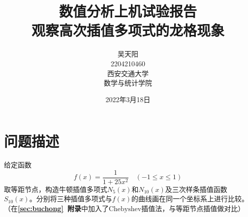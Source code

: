 \documentclass[12pt, a4paper, oneside]{ctexart}
\newcommand{\xiaosihao}{\fontsize{12pt}{\baselineskip}\selectfont}
\begin{document}
\newtheorem{example}{例}             %
\newtheorem{algorithm}{算法}
\newtheorem{theorem}{定理}[section]  %
\newtheorem{definition}{定义}
\newtheorem{axiom}{公理}
\newtheorem{property}{性质}
\newtheorem{proposition}{命题}
\newtheorem{lemma}{引理}
\newtheorem{corollary}{推论}
\newtheorem{remark}{注解}
\newtheorem{condition}{条件}
\newtheorem{conclusion}{结论}
\newtheorem{assumption}{假设}

\renewcommand{\contentsname}{目录}  %
\renewcommand{\abstractname}{摘要}  %
\renewcommand{\refname}{参考文献}   %
\renewcommand{\indexname}{索引}
\renewcommand{\figurename}{图}
\renewcommand{\tablename}{表}
\renewcommand{\appendixname}{附录}
\renewcommand{\algorithm}{算法}


\title{数值分析上机试验报告\\观察高次插值多项式的龙格现象}
\author{吴天阳\\2204210460\\[2ex]
\xiaosihao 西安交通大学\\ \xiaosihao 数学与统计学院\\[2ex]
}
\date{2022年3月18日}

\maketitle %
\newpage
\tableofcontents %

\newpage
\section{问题描述}
给定函数
\begin{equation*}
 f(x) = \dfrac{1}{1+25x^2}\quad (-1\leqslant x\leqslant 1)   
\end{equation*}
取等距节点，构造牛顿插值多项式$N_5(x)$和$N_{10}(x)$及三次样条插值函数$S_{10}(x)$。分别将三种插值多项式与$f(x)$的曲线画在同一个坐标系上进行比较。（在\textbf{\ref{sec:buchong}\ 附录}中加入了$\text{Chebyshev}$插值法，与等距节点插值做对比）
\end{document}
